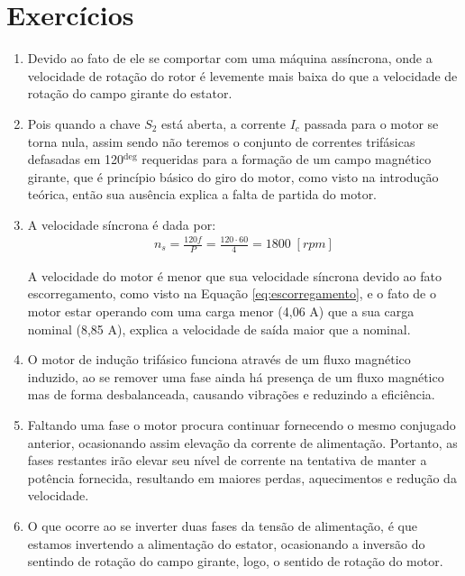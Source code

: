 \documentclass[a4paper,12pt,oneside]{article}
\begin{document}
\section{Exercícios}
\renewcommand{\labelenumi}{$\textbf{\textcolor{Azul}{\arabic{enumi}.}}$}
\renewcommand{\labelenumii}{$\textbf{\textcolor{Azul}{(\alph{enumii})}}$}
\renewcommand{\labelitemi}{\textbf{+}}
\begin{enumerate}

\item Devido ao fato de ele se comportar com uma máquina assíncrona, onde a velocidade de rotação do rotor é levemente mais baixa do que a velocidade de rotação do campo girante do estator.

\item Pois quando a chave $S_2$ está aberta, a corrente $I_c$ passada para o motor se torna nula, assim sendo não teremos o conjunto de correntes trifásicas defasadas em 120$^{\deg}$ requeridas para a formação de um campo magnético girante, que é princípio básico do giro do motor, como visto na introdução teórica, então sua ausência explica a falta de partida do motor.

\item A velocidade síncrona é dada por:
\begin{align}
n_s = \frac{120f}{P} = \frac{120\cdot 60}{4} = 1800 \; [rpm]
\end{align}

A velocidade do motor é menor que sua velocidade síncrona devido ao fato escorregamento, como visto na Equação \ref{eq:escorregamento}, e o fato de o motor estar operando com uma carga menor (4,06 A) que a sua carga nominal (8,85 A), explica a velocidade de saída maior que a nominal.

\item O motor de indução trifásico funciona através de um fluxo magnético induzido, ao se remover uma fase ainda há presença de um fluxo magnético mas de forma desbalanceada, causando vibrações e reduzindo a eficiência.

\item Faltando uma fase o motor procura continuar fornecendo o mesmo conjugado anterior, ocasionando assim elevação da corrente de alimentação. Portanto, as fases restantes irão elevar seu nível de corrente na tentativa de manter a potência fornecida, resultando em maiores perdas, aquecimentos e redução da velocidade.

\item O que ocorre ao se inverter duas fases da tensão de alimentação, é que estamos invertendo a alimentação do estator, ocasionando a inversão do sentindo de rotação do campo girante, logo, o sentido de rotação do motor.


\end{enumerate}
\end{document}
